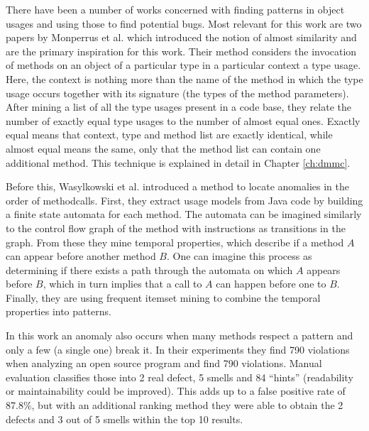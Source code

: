 There have been a number of works concerned with finding patterns in object usages and using those to find potential bugs.
Most relevant for this work are two papers by Monperrus et al.\cite{monperrus2010detecting}\cite{monperrus2013detecting} which introduced the notion of almost similarity and are the primary inspiration for this work.
Their method considers the invocation of methods on an object of a particular type in a particular context a type usage.
Here, the context is nothing more than the name of the method in which the type usage occurs together with its signature (the types of the method parameters).
After mining a list of all the type usages present in a code base, they relate the number of exactly equal type usages to the number of almost equal ones.
Exactly equal means that context, type and method list are exactly identical, while almost equal means the same, only that the method list can contain one additional method.
This technique is explained in detail in Chapter \ref{ch:dmmc}.


Before this, Wasylkowski et al. \cite{wasylkowski2007detecting} introduced a method to locate anomalies in the order of methodcalls.
First, they extract usage models from Java code by building a finite state automata for each method.
The automata can be imagined similarly to the control flow graph of the method with instructions as transitions in the graph.
From these they mine temporal properties, which describe if a method $A$ can appear before another method $B$.
One can imagine this process as determining if there exists a path through the automata on which $A$ appears before $B$, which in turn implies that a call to $A$ can happen before one to $B$.
Finally, they are using frequent itemset mining \cite{han2006data} to combine the temporal properties into patterns.

In this work an anomaly also occurs when many methods respect a pattern and only a few (a single one) break it.
In their experiments they find 790 violations when analyzing an open source program and find 790 violations.
Manual evaluation classifies those into 2 real defect, 5 smells and 84 ``hints'' (readability or maintainability could be improved).
This adds up to a false positive rate of 87.8\%, but with an additional ranking method they were able to obtain the 2 defects and 3 out of 5 smells within the top 10 results.

